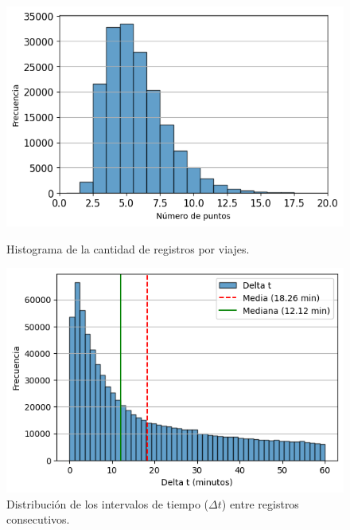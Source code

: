 \begin{figure}[!htb]
\centering
\begin{minipage}{0.45\textwidth}
    \centering
    \includegraphics[width=\textwidth]{Graphics/register_per_trip_histogram.png}
    \caption{Histograma de la cantidad de registros por viajes.}
    \label{fig:register_per_trip_histogram}
\end{minipage}%
\hfill
\begin{minipage}{0.45\textwidth}
    \centering
    \includegraphics[width=\textwidth]{Graphics/delta_t_histogram.png}
    \caption{Distribución de los intervalos de tiempo ($\Delta t$) entre registros consecutivos.}
    \label{fig:delta_t_histogram}
\end{minipage}%
\end{figure}

